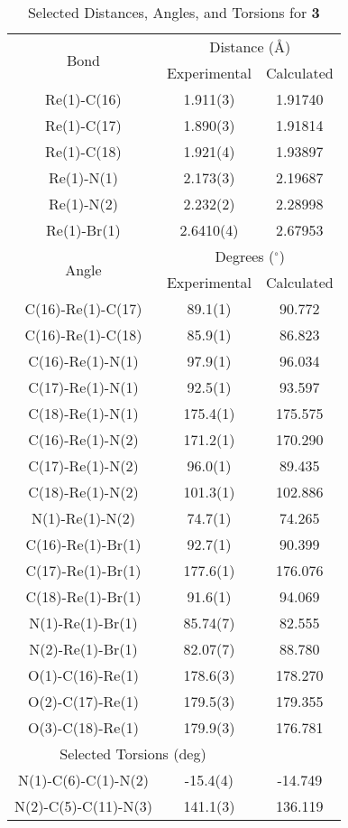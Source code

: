 \begin{table}[htbp]
  \caption{Selected Distances, Angles, and Torsions for \textbf{3}}
  \centering
    \begin{tabular}{ccc}
    \toprule
   \multirow{2}{*}{Bond} & \multicolumn{2}{c}{Distance (\r{A})} \\ \cline{2-3}
     & Experimental & Calculated \\ \midrule
    Re(1)-C(16) & 1.911(3) & 1.91740 \\
    Re(1)-C(17) & 1.890(3) & 1.91814 \\
    Re(1)-C(18) & 1.921(4) & 1.93897 \\
    Re(1)-N(1) & 2.173(3) & 2.19687 \\
    Re(1)-N(2) & 2.232(2) & 2.28998 \\
    Re(1)-Br(1) & 2.6410(4) & 2.67953 \\ \midrule
    \multirow{2}{*}{Angle} & \multicolumn{2}{c}{Degrees ($^\circ$)} \\ \cline{2-3}
     & Experimental & Calculated \\ \midrule
    C(16)-Re(1)-C(17) & 89.1(1) & 90.772 \\
    C(16)-Re(1)-C(18) & 85.9(1) & 86.823 \\
    C(16)-Re(1)-N(1) & 97.9(1) & 96.034 \\
    C(17)-Re(1)-N(1) & 92.5(1) & 93.597 \\
    C(18)-Re(1)-N(1) & 175.4(1) & 175.575 \\
    C(16)-Re(1)-N(2) & 171.2(1) & 170.290 \\
    C(17)-Re(1)-N(2) & 96.0(1) & 89.435 \\
    C(18)-Re(1)-N(2) & 101.3(1) & 102.886 \\
    N(1)-Re(1)-N(2) & 74.7(1) & 74.265 \\
    C(16)-Re(1)-Br(1) & 92.7(1) & 90.399 \\
    C(17)-Re(1)-Br(1) & 177.6(1) & 176.076 \\
    C(18)-Re(1)-Br(1) & 91.6(1) & 94.069 \\
    N(1)-Re(1)-Br(1) & 85.74(7) & 82.555 \\
    N(2)-Re(1)-Br(1) & 82.07(7) & 88.780 \\
    O(1)-C(16)-Re(1) & 178.6(3) & 178.270 \\
    O(2)-C(17)-Re(1) & 179.5(3) & 179.355 \\
    O(3)-C(18)-Re(1) & 179.9(3) & 176.781 \\ \midrule
    \multicolumn{2}{c}{Selected Torsions (deg)} \\ \midrule
    N(1)-C(6)-C(1)-N(2) & -15.4(4) & -14.749 \\
    N(2)-C(5)-C(11)-N(3) & 141.1(3) & 136.119 \\
    \bottomrule
    \end{tabular}%
  \label{tab.da3}%
\end{table}%


